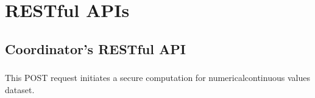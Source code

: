 \chapter{RESTful APIs}\label{c:restful-apis}

\section{Coordinator's RESTful API}\label{s:coordinator-api}

\subsection[/smpc/histogram/numerical POST request]{\protect{}}\label{s:post1}

  This POST request initiates a secure computation for numerical\myslash continuous values dataset.
